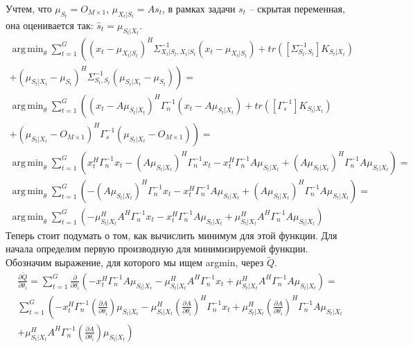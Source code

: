 \documentclass[11pt]{article}
\DeclareMathOperator*{\argmin}{arg\,min}
\begin{document}
Учтем, что $\mu_{S_t} = O_{M \times 1}$, $\mu_{X_t|S_t}=As_t$, в рамках задачи $s_t$ -- скрытая переменная, она оценивается так: $\hat{s}_t = \mu_{S_t|X_t}$.
\begin{equation}
\begin{gathered}
\argmin_{\theta}  \sum_{t=1}^G \left((x_t-\mu_{X_t|S_t})^H\Sigma_{X_t|S_t,X_t|S_t}^{-1}(x_t-\mu_{X_t|S_t}) +  tr([\Sigma_{S_t,S_t}^{-1}]K_{S_t|X_t}) \right. \\ \left. +  (\mu_{S_t|X_t}-\mu_{S_t})^H\Sigma_{S_t,S_t}^{-1}(\mu_{S_t|X_t}-\mu_{S_t})\right) = \\
\argmin_{\theta}  \sum_{t=1}^G \left((x_t-A\mu_{S_t|X_t})^H\Gamma_n^{-1}(x_t-A\mu_{S_t|X_t}) +  tr([\Gamma_s^{-1}]K_{S_t|X_t}) \right. \\ \left. +  (\mu_{S_t|X_t}-O_{M \times 1})^H\Gamma_s^{-1}(\mu_{S_t|X_t}-O_{M \times 1})\right) = \\
\argmin_{\theta}  \sum_{t=1}^G \left(x_t^H\Gamma_n^{-1}x_t -(A\mu_{S_t|X_t})^H\Gamma_n^{-1}x_t -x_t^H\Gamma_n^{-1}A\mu_{S_t|X_t} + (A\mu_{S_t|X_t})^H\Gamma_n^{-1}A\mu_{S_t|X_t} \right) =\\
\argmin_{\theta}  \sum_{t=1}^G \left(-(A\mu_{S_t|X_t})^H\Gamma_n^{-1}x_t -x_t^H\Gamma_n^{-1}A\mu_{S_t|X_t} + (A\mu_{S_t|X_t})^H\Gamma_n^{-1}A\mu_{S_t|X_t} \right) =\\
\argmin_{\theta}  \sum_{t=1}^G \left(-\mu_{S_t|X_t}^HA^H\Gamma_n^{-1}x_t -x_t^H\Gamma_n^{-1}A\mu_{S_t|X_t} + \mu_{S_t|X_t}^HA^H\Gamma_n^{-1}A\mu_{S_t|X_t} \right)
\end{gathered}
\end{equation}
Теперь стоит подумать о том, как вычислить минимум для этой функции. Для начала определим первую производную для минимизируемой функции.
Обозначим выражение, для которого мы ищем argmin, через $\tilde{Q}$. 
\begin{equation}
\begin{gathered}
\frac{\partial \tilde{Q}}{\partial \theta_i} = 
\sum_{t=1}^G \frac{\partial}{\partial \theta_i} \left(-x_t^H\Gamma_n^{-1}A\mu_{S_t|X_t}-\mu_{S_t|X_t}^HA^H\Gamma_n^{-1}x_t  + \mu_{S_t|X_t}^HA^H\Gamma_n^{-1}A\mu_{S_t|X_t} \right) = \\
\sum_{t=1}^G \left(-x_t^H\Gamma_n^{-1}\left(\frac{\partial A}{\partial \theta_i}\right)\mu_{S_t|X_t}-\mu_{S_t|X_t}^H\left(\frac{\partial A}{\partial \theta_i}\right)^H\Gamma_n^{-1}x_t  + \mu_{S_t|X_t}^H\left(\frac{\partial A}{\partial \theta_i}\right)^H\Gamma_n^{-1}A\mu_{S_t|X_t}  \right. \\
+ \left. \mu_{S_t|X_t}^HA^H\Gamma_n^{-1}\left(\frac{\partial A}{\partial \theta_i}\right)\mu_{S_t|X_t} \right) 
\end{gathered}
\end{equation}
\end{document}
